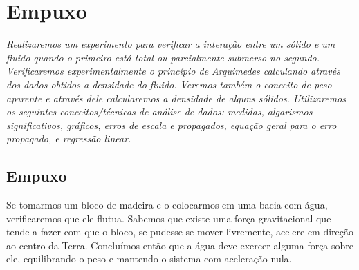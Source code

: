 \chapter{Empuxo} %
\label{Chap:ExpEmpuxo}        %

\begin{fullwidth}\it
	Realizaremos um experimento para verificar a interação entre um sólido e um fluido quando o primeiro está total ou parcialmente submerso no segundo. Verificaremos experimentalmente o princípio de Arquimedes calculando através dos dados obtidos a densidade do fluido. Veremos também o conceito de peso aparente e através dele calcularemos a densidade de alguns sólidos. Utilizaremos os seguintes conceitos/técnicas de análise de dados: medidas, algarismos significativos, gráficos, erros de escala e propagados, equação geral para o erro propagado, e regressão linear.
\end{fullwidth}

\section{Empuxo}

Se tomarmos um bloco de madeira e o colocarmos em uma bacia com água, verificaremos que ele flutua. Sabemos que existe uma força gravitacional que tende a fazer com que o bloco, se pudesse se mover livremente, acelere em direção ao centro da Terra. Concluímos então que a água deve exercer alguma força sobre ele, equilibrando o peso e mantendo o sistema com aceleração nula.

